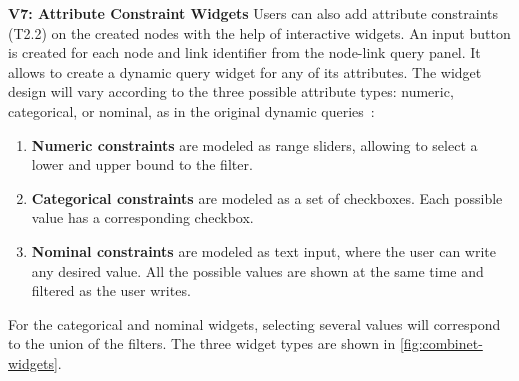 \noindent\textbf{V7: Attribute Constraint Widgets}\label{sec:attributes}
Users can also add attribute constraints (T2.2) on the created nodes with the help of interactive widgets.
An input button is created for each node and link identifier from the node-link query panel.
It allows to create a dynamic query widget for any of its attributes.
The widget design will vary according to the three possible attribute types: numeric, categorical, or nominal, as in the original dynamic queries~\cite{DynamicQueries}:
\begin{enumerate}
    \item \textbf{Numeric constraints} are modeled as range sliders, allowing to select a lower and upper bound to the filter.
    \item \textbf{Categorical constraints} are modeled as a set of checkboxes. Each possible value has a corresponding checkbox.
    \item \textbf{Nominal constraints} are modeled as text input, where the user can write any desired value. All the possible values are shown at the same time and filtered as the user writes.
\end{enumerate}

For the categorical and nominal widgets, selecting several values will correspond to the union of the filters.
The three widget types are shown in \autoref{fig:combinet-widgets}.


